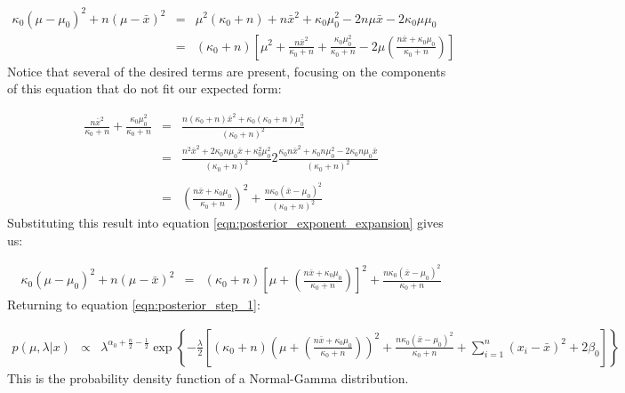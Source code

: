 \documentclass[12pt]{article} %
\begin{document}
	\begin{eqnarray}
	\kappa_0 (\mu - \mu_0) ^ 2 + n (\mu - \bar{x}) ^2 &=& \mu^2 (\kappa_0 + n) + n\bar{x}^2 + \kappa_0 \mu_0^2 -2n\mu\bar{x} -2 \kappa_0 \mu \mu_0 \\
	&=& (\kappa_0 + n) \left[\mu^2 + \frac{n\bar{x}^2}{\kappa_0 + n} + \frac{\kappa_0 \mu_0^2}{\kappa_0 + n} - 2 \mu \left(\frac{n\bar{x} + \kappa_0 \mu_0}{\kappa_0 + n}\right) \right] \label{eqn:posterior_exponent_expansion}
	\end{eqnarray}
	Notice that several of the desired terms are present, focusing on the components of this equation that do not fit our expected form:
	
	\begin{eqnarray}
	\frac{n\bar{x}^2}{\kappa_0 + n} + \frac{\kappa_0 \mu_0^2}{\kappa_0 + n} &=& \frac{n(\kappa_0 + n)\bar{x}^2 + \kappa_0(\kappa_0 + n)\mu_0^2}{(\kappa_0 + n)^2} \\
	&=& \frac{n^2 \bar{x}^2 + 2\kappa_0 n \mu_0 \bar{x} + \kappa_0^ 2 \mu_0 ^ 2}{(\kappa_0 + n)^2} 2 \frac{\kappa_0 n \bar{x}^2 + \kappa_0 n\mu_0^2 - 2\kappa_0 n \mu_0 \bar{x}}{(\kappa_0 + n)^2} \\
	\\
	&=& \left(\frac{n\bar{x} + \kappa_0 \mu_0}{\kappa_0 + n}\right)^2 + \frac{n\kappa_0\left(\bar{x} - \mu_0 \right)^2}{(\kappa_0 + n)^2}
	\end{eqnarray}
	Substituting this result into equation \ref{eqn:posterior_exponent_expansion} gives us:
	
	\begin{eqnarray}
	\kappa_0 (\mu - \mu_0) ^ 2 + n (\mu - \bar{x}) ^2 &=& (\kappa_0 + n) \left[\mu + \left(\frac{n\bar{x} + \kappa_0 \mu_0}{\kappa_0 + n}\right) \right]^2 + \frac{n\kappa_0\left(\bar{x} - \mu_0 \right)^2}{\kappa_0 + n}
	\end{eqnarray}
	Returning to equation \ref{eqn:posterior_step_1}:
	
	\begin{eqnarray}
	p(\mu, \lambda | x) &\propto& \lambda^{\alpha_0 + \frac{n}{2} - \frac{1}{2}} \exp \left\{-\frac{\lambda}{2}\left[
	(\kappa_0 + n) \left(\mu + \left(\frac{n\bar{x} + \kappa_0 \mu_0}{\kappa_0 + n}\right) \right)^2 + \frac{n\kappa_0\left(\bar{x} - \mu_0 \right)^2}{\kappa_0 + n} + \sum_{i=1}^n(x_i - \bar{x})^2 + 2\beta_0\right]\right\} \label{eqn:posterior}
	\end{eqnarray}
	This is the probability density function of a Normal-Gamma distribution.
	
\end{document}
